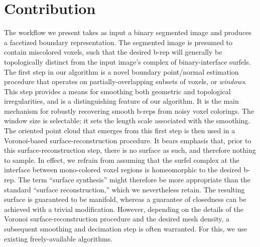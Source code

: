 \section{Contribution}
\label{sec:Contribution}

The workflow we present takes as input a binary segmented image and produces a facetized boundary representation.  The segmented image is presumed to contain miscolored voxels, such that the desired b-rep will generally be topologically distinct from the input image's complex of binary-interface surfels.  The first step in our algorithm is a novel boundary point/normal estimation procedure that operates on partially-overlapping subsets of voxels, or {\em windows}.  This step provides a means for smoothing both geometric and topological irregularities, and is a distinguishing feature of our algorithm.  It is the main mechanism for robustly recovering smooth b-reps from noisy voxel colorings.  The window size is selectable; it sets the length scale associated with the smoothing.  The oriented point cloud that emerges from this first step is then used in a Voronoi-based surface-reconstruction procedure.  It bears emphasis that, prior to this surface-reconstruction step, there is no surface as such, and therefore nothing to sample.  In effect, we refrain from assuming that the surfel complex at the interface between mono-colored voxel regions is homeomorphic to the desired b-rep.  The term ``surface synthesis'' might therefore be more appropriate than the standard ``surface reconstruction,'' which we nevertheless retain. The resulting surface is guaranteed to be manifold, whereas a guarantee of closedness can be achieved with a trivial modification.  However, depending on the details of the Voronoi surface-reconstruction procedure and the desired mesh density, a subsequent smoothing and decimation step is often warranted.  For this, we use existing freely-available algorithms.

